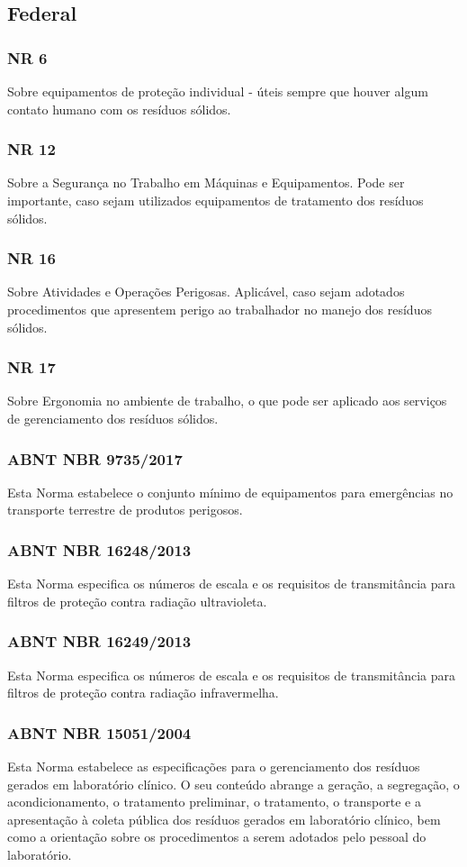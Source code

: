 \begin{subapend}
	\subsection{Federal}
	\begin{subsubapend}
		\item \subsubsection{NR 6}
		Sobre equipamentos de proteção individual - úteis sempre que houver algum contato humano com os resíduos sólidos.
		\subsubsection{NR 12}
		Sobre a Segurança no Trabalho em Máquinas e Equipamentos. Pode ser importante, caso sejam utilizados equipamentos de tratamento dos resíduos sólidos.
		\subsubsection{NR 16}
		Sobre Atividades e Operações Perigosas. Aplicável, caso sejam adotados procedimentos que apresentem perigo ao trabalhador no manejo dos resíduos sólidos.
		\subsubsection{NR 17}
		Sobre Ergonomia no ambiente de trabalho, o que pode ser aplicado aos serviços de gerenciamento dos resíduos sólidos.
		\subsubsection{ ABNT NBR 9735/2017}
		Esta Norma estabelece o conjunto mínimo de equipamentos para emergências no transporte terrestre de produtos perigosos.
		\subsubsection{	ABNT NBR 16248/2013}
		Esta Norma especifica os números de escala e os requisitos de transmitância para filtros de proteção contra radiação ultravioleta.
		\subsubsection{ ABNT NBR 16249/2013}
		Esta Norma especifica os números de escala e os requisitos de transmitância para filtros de proteção contra radiação infravermelha.
		\subsubsection{ABNT NBR 15051/2004}
		Esta Norma estabelece as especificações para o gerenciamento dos resíduos gerados em laboratório clínico. O seu conteúdo abrange a geração, a segregação, o acondicionamento, o tratamento preliminar, o tratamento, o transporte e a apresentação à coleta pública dos resíduos gerados em laboratório clínico, bem como a orientação sobre os procedimentos a serem adotados pelo pessoal do laboratório.
	\end{subsubapend}
\end{subapend}

